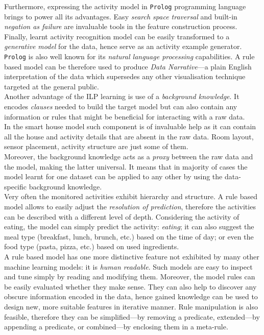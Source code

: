 \documentclass[10pt, a4paper, pdflatex, leqno, twoside, openright]{report}
\begin{document}
Furthermore, expressing the activity model in \texttt{Prolog} programming language brings to power all its advantages. Easy \emph{search space traversal} and built-in \emph{negation as failure} are invaluable tools in the feature construction process. Finally, learnt activity recognition model can be easily transformed to a \emph{generative model} for the data, hence serve as an activity example generator.\\
\texttt{Prolog} is also well known for its \emph{natural language processing} capabilities. A rule based model can be therefore used to produce \emph{Data Narrative}---a plain English interpretation of the data which supersedes any other visualisation technique targeted at the general public.\\

Another advantage of the ILP learning is use of a \emph{background knowledge}. It encodes \emph{clauses} needed to build the target model but can also contain any information or rules that might be beneficial for interacting with a raw data.\\
In the smart house model such component is of invaluable help as it can contain all the house and activity details that are absent in the raw data. Room layout, sensor placement, activity structure are just some of them.\\
Moreover, the background knowledge acts as a \emph{proxy} between the raw data and the model, making the latter universal. It means that in majority of cases the model learnt for one dataset can be applied to any other by using the data-specific background knowledge.\\

Very often the monitored activities exhibit hierarchy and structure. A rule based model allows to easily adjust the \emph{resolution of prediction}, therefore the activities can be described with a different level of depth. Considering the activity of eating, the model can simply predict the activity: \emph{eating}; it can also suggest the meal type (breakfast, lunch, brunch, etc.) based on the time of day; or even the food type (pasta, pizza, etc.) based on used ingredients.\\

A rule based model has one more distinctive feature not exhibited by many other machine learning models: it is \emph{human readable}. Such models are easy to inspect and tune simply by reading and modifying them. Moreover, the model rules can be easily evaluated whether they make sense. They can also help to discover any obscure information encoded in the data, hence gained knowledge can be used to design new, more suitable features in iterative manner. Rule manipulation is also feasible, therefore they can be simplified---by removing a predicate, extended---by appending a predicate, or combined---by enclosing them in a meta-rule.
\end{document}
